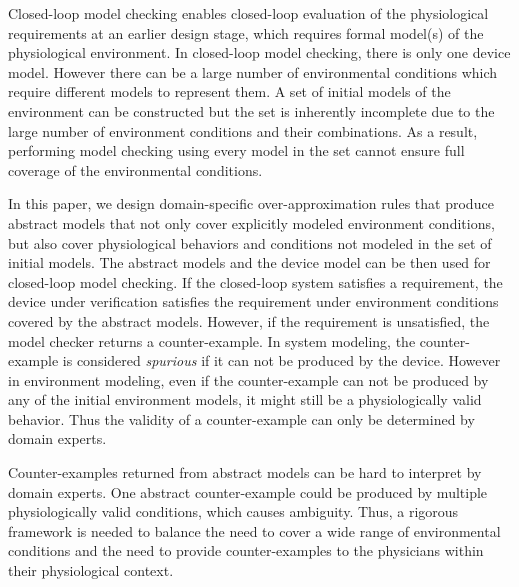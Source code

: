 Closed-loop model checking enables closed-loop evaluation of the physiological requirements at an earlier design stage, which requires formal model(s) of the physiological environment. 
In closed-loop model checking, there is only one device model. 
However there can be a large number of environmental conditions which require different models to represent them.
A set of initial models of the environment can be constructed but the set is inherently incomplete due to the large number of environment conditions and their combinations. 
As a result, performing model checking using every model in the set cannot ensure full coverage of the environmental conditions. 

In this paper, we design domain-specific over-approximation rules that produce abstract models that not only cover explicitly modeled environment conditions, but also cover physiological behaviors and conditions not modeled in the set of initial models. 
The abstract models and the device model can be then used for closed-loop model checking. 
If the closed-loop system satisfies a requirement, the device under verification satisfies the requirement under environment conditions covered by the abstract models. 
However, if the requirement is unsatisfied, the model checker returns a counter-example. 
In system modeling, the counter-example is considered \emph{spurious} if it can not be produced by the device.
However in environment modeling, even if the counter-example can not be produced by any of the initial environment models, it might still be a physiologically valid behavior.
Thus the validity of a counter-example can only be determined by domain experts. 

Counter-examples returned from abstract models can be hard to interpret by domain experts.
One abstract counter-example could be produced by multiple physiologically valid conditions, which causes ambiguity.
Thus, a rigorous framework is needed to balance the need to cover a wide range of environmental conditions and the need to provide counter-examples to the physicians within their physiological context.

